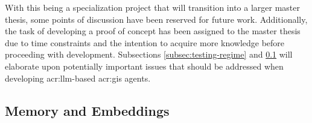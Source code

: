 With this being a specialization project that will transition into a larger master thesis, some points of discussion have been reserved for future work. Additionally, the task of developing a proof of concept has been assigned to the master thesis due to time constraints and the intention to acquire more knowledge before proceeding with development. Subsections \ref{subsec:testing-regime} and \ref{subsec:memory-and-embeddings} will elaborate upon potentially important issues that should be addressed when developing \acrshort{acr:llm}-based \acrshort{acr:gis} agents.




\subsection{Memory and Embeddings}\label{subsec:memory-and-embeddings}

